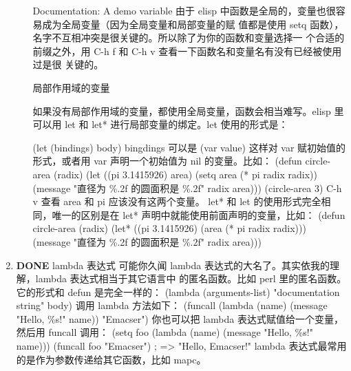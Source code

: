 \documentclass[11pt]{ctexart}
\begin{document}
\begin{enumerate}
\begin{enumerate}
Documentation:
A demo variable
由于 elisp 中函数是全局的，变量也很容易成为全局变量（因为全局变量和局部变量的赋
值都是使用 setq 函数），名字不互相冲突是很关键的。所以除了为你的函数和变量选择一
个合适的前缀之外，用 C-h f 和 C-h v 查看一下函数名和变量名有没有已经被使用过是很
关键的。

局部作用域的变量

如果没有局部作用域的变量，都使用全局变量，函数会相当难写。elisp 里可以用 let 和
let* 进行局部变量的绑定。let 使用的形式是：

(let (bindings)
body)
bingdings 可以是 (var value) 这样对 var 赋初始值的形式，或者用 var 声明一个初始值为 nil 的变量。比如：
(defun circle-area (radix)
(let ((pi 3.1415926)
area)
(setq area (* pi radix radix))
(message "直径为 \%.2f 的圆面积是 \%.2f" radix area)))
(circle-area 3)
C-h v 查看 area 和 pi 应该没有这两个变量。
let* 和 let 的使用形式完全相同，唯一的区别是在 let* 声明中就能使用前面声明的变量，比如：
(defun circle-area (radix)
(let* ((pi 3.1415926)
(area (* pi radix radix)))
(message "直径为 \%.2f 的圆面积是 \%.2f" radix area)))
\end{enumerate}

\item {\bfseries\sffamily DONE} lambda 表达式
\label{sec:org76c1985}
可能你久闻 lambda 表达式的大名了。其实依我的理解，lambda 表达式相当于其它语言中
的匿名函数。比如 perl 里的匿名函数。它的形式和 defun 是完全一样的：
(lambda (arguments-list)
"documentation string"
body)
调用 lambda 方法如下：
(funcall (lambda (name)
(message "Hello, \%s!" name)) "Emacser")
你也可以把 lambda 表达式赋值给一个变量，然后用 funcall 调用：
(setq foo (lambda (name)
(message "Hello, \%s!" name)))
(funcall foo "Emacser")                   ; => "Hello, Emacser!"
lambda 表达式最常用的是作为参数传递给其它函数，比如 mapc。
\end{enumerate}
\end{document}
